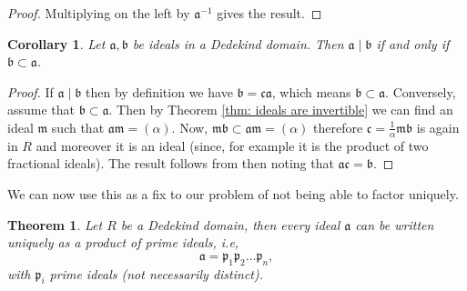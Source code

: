 \documentclass[11pt,a4paper]{report}
\theoremstyle{plain}
\newtheorem{theorem}[subsection]{Theorem}
\newtheorem{corollary}[subsection]{Corollary}
\theoremstyle{definition}
\theoremstyle{definition}
\def\gothb{\mathfrak{b}}
\def\gothc{\mathfrak{c}}
\def\gothm{\mathfrak{m}}
\def\gothp{\mathfrak{p}}
\def \a{\alpha}
\def\gotha{\mathfrak{a}}
\begin{document}
	\begin{proof}
		Multiplying on the left by $\gotha^{-1}$ gives the result.
	\end{proof}
	
	\begin{corollary}\label{cor: ideal div}
		Let $\gotha,\gothb$ be ideals in a Dedekind domain. Then $\gotha \mid \gothb$ if and only if\/ $\gothb \subset \gotha$.
	\end{corollary}
	
	\begin{proof}
		If $\gotha \mid \gothb$ then by definition we have $\gothb=\gothc \gotha$, which means $\gothb \subset \gotha$. Conversely, assume that $\gothb \subset \gotha$. Then by Theorem \ref{thm: ideals are invertible} we can find an ideal $\gothm$ such that $\gotha\gothm=(\a)$. Now, $\gothm \gothb \subset \gotha\gothm=(\a)$ therefore	 $\gothc=\frac{1}{\a}\gothm \gothb$ is again in $R$ and moreover  it is an ideal (since, for example it is the product of two fractional ideals). The result follows from then noting that $\gotha \gothc=\gothb$.
	\end{proof}
	
	
	
	We can now use this as a fix to our problem of not being able to factor uniquely.
	
	\begin{theorem}\label{thm: ded dom ideal is prod of prim} Let $R$ be a Dedekind domain, then every ideal $\gotha$ can be written uniquely as a product of prime ideals, i.e, \[\gotha=\gothp_1\gothp_2\dots\gothp_n,\] with $\gothp_i$ prime ideals (not necessarily distinct).
		
	\end{theorem}
	
	
	
\end{document}
